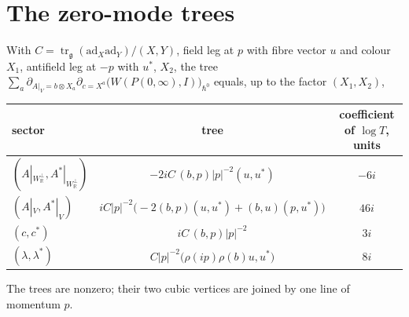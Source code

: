 \section{The zero-mode trees}

\begin{proposition}
\label{prop:kj-trees}
With $C=\operatorname{tr}_{\mathfrak g}(\mathrm{ad}_X\mathrm{ad}_Y)/(X,Y)$, field leg at $p$ with fibre vector $u$ and colour $X_1$, antifield leg at $-p$ with $u^*$, $X_2$, the tree $\sum_a\partial_{A|_V=b\otimes X_a}\partial_{c=X^a}\big(W(P(0,\infty),I)\big)_{\hbar^0}$ equals, up to the factor $(X_1,X_2)$,
\begin{center}
\begin{tabular}{l|c|c}
sector & tree & coefficient of $\log T$, units \\
\hline
$(A|_{W_{\mathbb R}^\perp},A^*|_{W_{\mathbb R}^\perp})$ & $-2iC\,(b,p)|p|^{-2}(u,u^*)$ & $-6i$ \\
$(A|_V,A^*|_V)$ & $iC|p|^{-2}\big(-2(b,p)(u,u^*)+(b,u)(p,u^*)\big)$ & $46i$ \\
$(c,c^*)$ & $iC\,(b,p)|p|^{-2}$ & $3i$ \\
$(\lambda,\lambda^*)$ & $C|p|^{-2}\big(\rho(ip)\rho(b)u,u^*\big)$ & $8i$ \\
\end{tabular}
\end{center}
The trees are nonzero; their two cubic vertices are joined by one line of momentum $p$.
\end{proposition}

